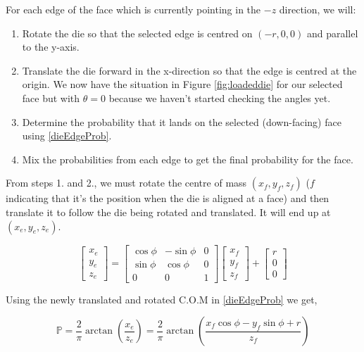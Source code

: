 \documentclass[english,12pt,a4paper,final]{article}
\begin{document}
For each edge of the face which is currently pointing in the $-z$ direction, we will:

\begin{enumerate}
	\item Rotate the die so that the selected edge is centred on $(-r, 0, 0)$ and parallel to the y-axis.
	\item Translate the die forward in the x-direction so that the edge is centred at the origin. We now have the situation in Figure \ref{fig:loadeddie} for our selected face but with $\theta=0$ because we haven't started checking the angles yet.
	\item Determine the probability that it lands on the selected (down-facing) face using \eqref{dieEdgeProb}.
	\item Mix the probabilities from each edge to get the final probability for the face.
\end{enumerate}

From steps 1. and 2., we must rotate the centre of mass $(x_f, y_f, z_f)$ ($f$ indicating that it's the position when the die is aligned at a face) and then translate it to follow the die being rotated and translated. It will end up at $(x_e, y_e, z_e)$.

\begin{equation*}
	\begin{bmatrix}x_e\\y_e\\z_e\end{bmatrix} = \begin{bmatrix}\cos\phi & -\sin\phi & 0 \\ \sin\phi & \cos\phi & 0 \\ 0 & 0 & 1\end{bmatrix} \begin{bmatrix}x_f\\y_f\\z_f\end{bmatrix} + \begin{bmatrix}r\\0\\0\end{bmatrix}
\end{equation*}

Using the newly translated and rotated C.O.M in \eqref{dieEdgeProb} we get,

\begin{equation*}
	\mathbb{P} = \frac{2}{\pi}\arctan\left(\frac{x_e}{z_e}\right) = \frac{2}{\pi}\arctan\left(\frac{x_f\cos\phi-y_f\sin\phi+r}{z_f}\right)
\end{equation*}
\end{document}
